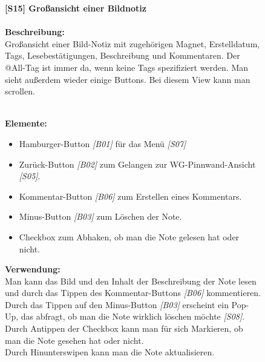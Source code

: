 \documentclass[a4paper]{scrreprt}
\begin{document}
\begin{figure}[h!]
\begin{minipage}[t]{0.4\linewidth}
    		\end{minipage}
    		\hspace{0.5cm}
    		\begin{minipage}[t]{0.55\linewidth}
    			\flushleft
    			\vspace{9mm}
    			\textbf{{[}S15{]} Großansicht einer Bildnotiz} \\
    			\hfill
    			\\
    			\textbf{Beschreibung:} \\
    			Großansicht einer Bild-Notiz mit zugehörigen Magnet, Erstelldatum, Tags, Lesebestätigungen, Beschreibung und Kommentaren. Der @All-Tag ist immer da, wenn keine Tags spezifiziert werden. Man sieht außerdem wieder einige Buttons. Bei diesem View kann man scrollen.
    			
    			\hfill 
    			\\\textbf{Elemente:}\\
    			\begin{itemize}
    				\renewcommand\labelitemi{--}
    				\item  Hamburger-Button \textit{{[}B01{]}} für das Menü \textit{{[}S07{]}}
    				\item Zurück-Button \textit{{[}B02{]}} zum Gelangen zur
    				WG-Pinnwand-Ansicht \textit{{[}S05{]}}.
    				\item Kommentar-Button \textit{{[}B06{]}} zum Erstellen eines
    				Kommentars.
    				\item Minus-Button \textit{{[}B03{]}} zum Löschen der Note.
    				\item Checkbox zum Abhaken, ob man die Note gelesen hat oder nicht.
    				
    			\end{itemize}
    			
    			
    			\hfill 
    			
    			\textbf{Verwendung:}\\
    			Man kann das Bild und den Inhalt der
    			Beschreibung der Note lesen und durch
    			das Tippen des Kommentar-Buttons \textit{{[}B06{]}}
    			kommentieren. \\
    			Durch das Tippen auf den 
    			Minus-Button \textit{{[}B03{]}} erscheint ein Pop-Up, das abfragt, ob man die Note wirklich löschen möchte \textit{{[}S08{]}}.\\ 
    			Durch Antippen der Checkbox kann man für sich Markieren, ob man die Note gesehen hat oder nicht.\\ 
    			Durch Hinunterswipen kann man die Note aktualisieren.
    			
    		\end{minipage}
    	\end{figure}
    	
\end{document}
